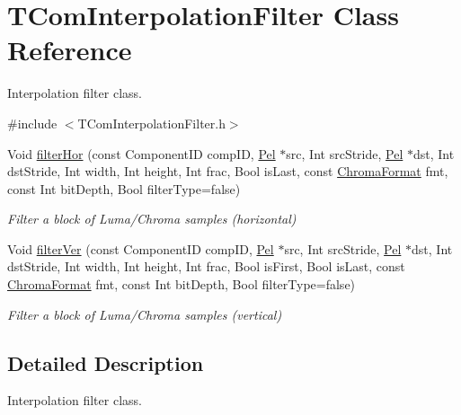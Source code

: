 \hypertarget{class_t_com_interpolation_filter}{}\section{T\+Com\+Interpolation\+Filter Class Reference}
\label{class_t_com_interpolation_filter}


Interpolation filter class.  




{\ttfamily \#include $<$T\+Com\+Interpolation\+Filter.\+h$>$}

\begin{DoxyCompactItemize}
\item 
Void \hyperlink{class_t_com_interpolation_filter_a37c22c38efbf42d24b058b3538e13c0e}{filter\+Hor} (const Component\+ID comp\+ID, \hyperlink{_type_def_8h_af92141699657699b4b547be0c8517541}{Pel} $\ast$src, Int src\+Stride, \hyperlink{_type_def_8h_af92141699657699b4b547be0c8517541}{Pel} $\ast$dst, Int dst\+Stride, Int width, Int height, Int frac, Bool is\+Last, const \hyperlink{_type_def_8h_a4a6c51c10f2eb04abc7209db7caff39f}{Chroma\+Format} fmt, const Int bit\+Depth, Bool filter\+Type=false)
\begin{DoxyCompactList}\small\item\em Filter a block of Luma/\+Chroma samples (horizontal) \end{DoxyCompactList}\item 
Void \hyperlink{class_t_com_interpolation_filter_ad0dae7f8afc95ecc913cbd0fa091750b}{filter\+Ver} (const Component\+ID comp\+ID, \hyperlink{_type_def_8h_af92141699657699b4b547be0c8517541}{Pel} $\ast$src, Int src\+Stride, \hyperlink{_type_def_8h_af92141699657699b4b547be0c8517541}{Pel} $\ast$dst, Int dst\+Stride, Int width, Int height, Int frac, Bool is\+First, Bool is\+Last, const \hyperlink{_type_def_8h_a4a6c51c10f2eb04abc7209db7caff39f}{Chroma\+Format} fmt, const Int bit\+Depth, Bool filter\+Type=false)
\begin{DoxyCompactList}\small\item\em Filter a block of Luma/\+Chroma samples (vertical) \end{DoxyCompactList}\end{DoxyCompactItemize}


\subsection{Detailed Description}
Interpolation filter class. 

